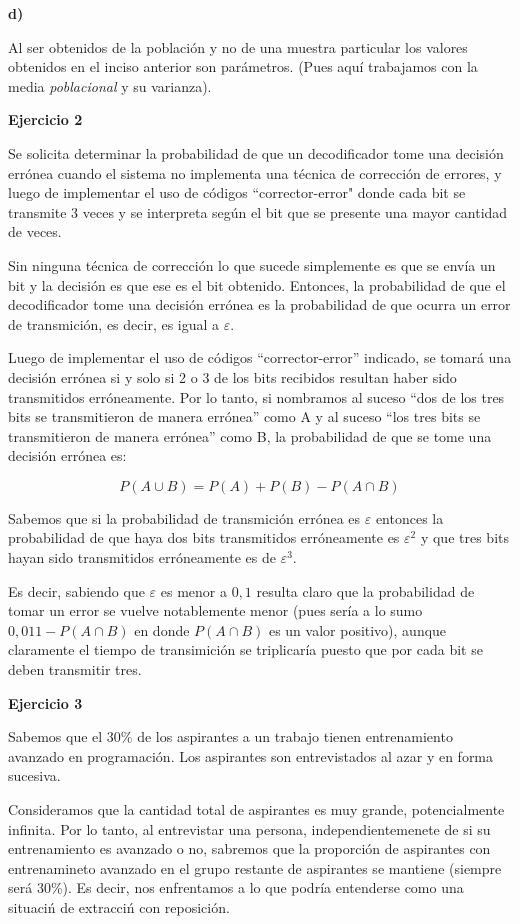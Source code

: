 \documentclass[11pt]{article}
\begin{document}
\textbf{d)} \par

Al ser obtenidos de la poblaci\'on y no de una muestra particular los valores obtenidos en el inciso anterior son par\'ametros. (Pues aqu\'i trabajamos con la media \emph{poblacional} y su varianza).




\textbf{Ejercicio 2}

Se solicita determinar la probabilidad de que un decodificador tome una decisi\'on err\'onea cuando el sistema no implementa una t\'ecnica de correcci\'on de errores, y luego de implementar el uso de c\'odigos ``corrector-error" donde cada bit se transmite 3 veces y se interpreta seg\'un el bit que se presente una mayor cantidad de veces. 

Sin ninguna t\'ecnica de correcci\'on lo que sucede simplemente es que se env\'ia un bit y la decisi\'on es que ese es el bit obtenido. Entonces, la probabilidad de que el decodificador tome una decisi\'on err\'onea es la probabilidad de que ocurra un error de transmici\'on, es decir, es igual a $\varepsilon$. 

Luego de implementar el uso de c\'odigos ``corrector-error'' indicado, se tomar\'a una decisi\'on err\'onea si y solo si 2 o 3 de los bits recibidos resultan haber sido transmitidos err\'oneamente. Por lo tanto, si nombramos al suceso ``dos de los tres bits se transmitieron de manera err\'onea'' como A y al suceso ``los tres bits se transmitieron de manera err\'onea'' como B, la probabilidad de que se tome una decisi\'on err\'onea es:

\[P(A\cup B) = P(A)+P(B)-P(A\cap B)\]

Sabemos que si la probabilidad de transmici\'on err\'onea es $\varepsilon$ entonces la probabilidad de que haya dos bits transmitidos err\'oneamente es $\varepsilon^{2}$ y que tres bits hayan sido transmitidos err\'oneamente es de $\varepsilon^3$. 

Es decir, sabiendo que $\varepsilon$ es menor a $0,1$ resulta claro que la probabilidad de tomar un error se vuelve notablemente menor (pues ser\'ia a lo sumo $0,011-P(A\cap B)$ en donde $P(A\cap B)$ es un valor positivo), aunque claramente el tiempo de transimici\'on se triplicar\'ia puesto que por cada bit se deben transmitir tres.

\textbf{Ejercicio 3}

Sabemos que el 30\% de los aspirantes a un trabajo tienen entrenamiento avanzado en programaci\'on. Los aspirantes son entrevistados al azar y en forma sucesiva. \par
Consideramos que la cantidad total de aspirantes es muy grande, potencialmente infinita. Por lo tanto, al entrevistar una persona, independientemenete de si su entrenamiento es avanzado o no, sabremos que la proporci\'on de aspirantes con entrenamineto avanzado en el grupo restante de aspirantes se mantiene (siempre ser\'a 30\%). Es decir, nos enfrentamos a lo que podr\'ia entenderse como una situaci\'n de extracci\'n con reposici\'on. \par
\end{document}
